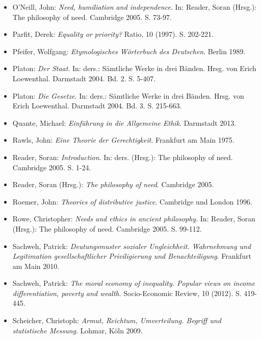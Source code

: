 \documentclass[a4paper]{thesis}
\begin{document}
\begin{itemize}[leftmargin=1.5em,label={},itemindent=-1.5em, itemsep=-1ex]
\item O'Neill, John: \textit{Need, humiliation and independence}. In: Reader, Soran (Hrsg.): The philosophy of need. Cambridge 2005. S. 73-97.

\item Parfit, Derek: \textit{Equality or priority?} Ratio, 10 (1997). S. 202-221.

\item Pfeifer, Wolfgang: \textit{Etymologisches Wörterbuch des Deutschen}. Berlin 1989.

\item Platon: \textit{Der Staat}. In: ders.: Sämtliche Werke in drei Bänden. Hrsg. von Erich Loewenthal. Darmstadt 2004. Bd. 2. S. 5-407.

\item Platon: \textit{Die Gesetze}. In: ders.: Sämtliche Werke in drei Bänden. Hrsg. von Erich Loewenthal. Darmstadt 2004. Bd. 3. S. 215-663.

\item Quante, Michael: \textit{Einführung in die Allgemeine Ethik}. Darmstadt 2013.

\item Rawls, John: \textit{Eine Theorie der Gerechtigkeit}. Frankfurt am Main 1975.

\item Reader, Soran: \textit{Introduction}. In: ders. (Hrsg.): The philosophy of need. Cambridge 2005. S. 1-24.

\item Reader, Soran (Hrsg.): \textit{The philosophy of need}. Cambridge 2005.

\item Roemer, John: \textit{Theories of distributive justice}. Cambridge und London 1996.

\item Rowe, Christopher: \textit{Needs and ethics in ancient philosophy}. In: Reader, Soran (Hrsg.): The philosophy of need. Cambridge 2005. S. 99-112.

\item Sachweh, Patrick: \textit{Deutungsmuster sozialer Ungleichheit. Wahrnehmung und Legitimation gesellschaftlicher Priviligierung und Benachteiligung}. Frankfurt am Main 2010.

\item Sachweh, Patrick: \textit{The moral economy of inequality. Popular views on income differentiation, poverty and wealth}. Socio-Economic Review, 10 (2012). S. 419-445.

\item Scheicher, Christoph: \textit{Armut, Reichtum, Umverteilung. Begriff und statistische Messung}. Lohmar, Köln 2009.


\end{itemize}
\end{document}
